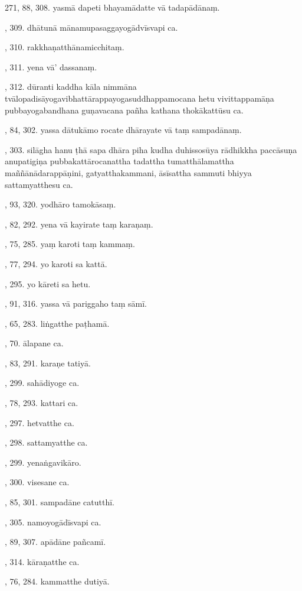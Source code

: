 271, 88, 308. yasmā dapeti bhayamādatte vā tadapādānaṃ.\par {}, 309. dhātunā mānamupasaggayogādvīsvapi ca.\par {}, 310. rakkhaṇatthānamicchitaṃ.\par {}, 311. yena vā’ dassanaṃ.\par {}, 312. dūranti kaddha kāla nimmāna tvālopadisāyogavibhattārappayogasuddhappamocana hetu vivittappamāṇa pubbayogabandhana guṇavacana pañha kathana thokākattūsu ca.\par {}, 84, 302. yassa dātukāmo rocate dhārayate vā taṃ sampadānaṃ.\par {}, 303. silāgha hanu ṭhā sapa dhāra piha kudha duhissosūya rādhikkha paccāsuṇa anupatigiṇa pubbakattārocanattha tadattha tumatthālamattha maññānādarappāṇini, gatyatthakammani, āsīsattha sammuti bhiyya sattamyatthesu ca.\par {}, 93, 320. yodhāro tamokāsaṃ.\par {}, 82, 292. yena vā kayirate taṃ karaṇaṃ.\par {}, 75, 285. yaṃ karoti taṃ kammaṃ.\par {}, 77, 294. yo karoti sa kattā.\par {}, 295. yo kāreti sa hetu.\par {}, 91, 316. yassa vā pariggaho taṃ sāmī.\par {}, 65, 283. liṅgatthe paṭhamā.\par {}, 70. ālapane ca.\par {}, 83, 291. karaṇe tatiyā.\par {}, 299. sahādiyoge ca.\par {}, 78, 293. kattari ca.\par {}, 297. hetvatthe ca.\par {}, 298. sattamyatthe ca.\par {}, 299. yenaṅgavikāro.\par {}, 300. visesane ca.\par {}, 85, 301. sampadāne catutthī.\par {}, 305. namoyogādīsvapi ca.\par {}, 89, 307. apādāne pañcamī.\par {}, 314. kāraṇatthe ca.\par {}, 76, 284. kammatthe dutiyā.\par \noindent
